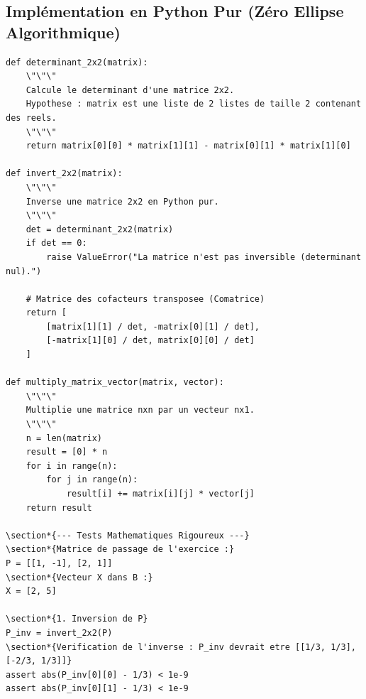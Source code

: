 \documentclass{report}
\begin{document}
\subsection*{Implémentation en Python Pur (Zéro Ellipse Algorithmique)}

\begin{verbatim}
def determinant_2x2(matrix):
    \"\"\"
    Calcule le determinant d'une matrice 2x2.
    Hypothese : matrix est une liste de 2 listes de taille 2 contenant des reels.
    \"\"\"
    return matrix[0][0] * matrix[1][1] - matrix[0][1] * matrix[1][0]

def invert_2x2(matrix):
    \"\"\"
    Inverse une matrice 2x2 en Python pur.
    \"\"\"
    det = determinant_2x2(matrix)
    if det == 0:
        raise ValueError("La matrice n'est pas inversible (determinant nul).")

    # Matrice des cofacteurs transposee (Comatrice)
    return [
        [matrix[1][1] / det, -matrix[0][1] / det],
        [-matrix[1][0] / det, matrix[0][0] / det]
    ]

def multiply_matrix_vector(matrix, vector):
    \"\"\"
    Multiplie une matrice nxn par un vecteur nx1.
    \"\"\"
    n = len(matrix)
    result = [0] * n
    for i in range(n):
        for j in range(n):
            result[i] += matrix[i][j] * vector[j]
    return result

\section*{--- Tests Mathematiques Rigoureux ---}
\section*{Matrice de passage de l'exercice :}
P = [[1, -1], [2, 1]]
\section*{Vecteur X dans B :}
X = [2, 5]

\section*{1. Inversion de P}
P_inv = invert_2x2(P)
\section*{Verification de l'inverse : P_inv devrait etre [[1/3, 1/3], [-2/3, 1/3]]}
assert abs(P_inv[0][0] - 1/3) < 1e-9
assert abs(P_inv[0][1] - 1/3) < 1e-9


\end{verbatim}
\end{document}
